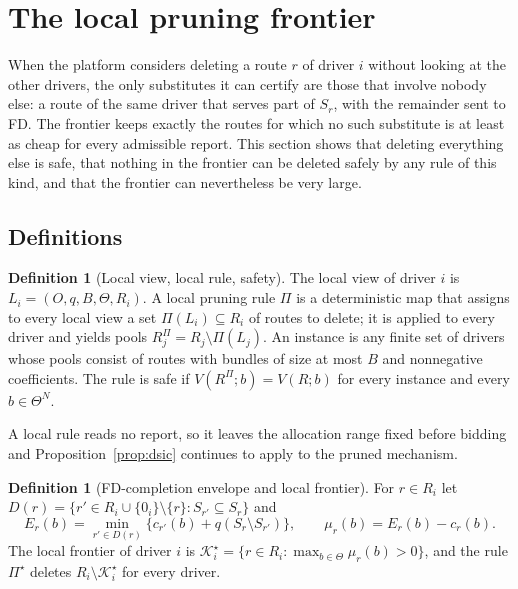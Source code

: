 \documentclass[review,12pt]{elsarticle}
\theoremstyle{definition}
\newtheorem{definition}[theorem]{Definition}
\theoremstyle{remark}
\newcommand{\Kstar}{\mathcal{K}^\star}
\begin{document}
\section{The local pruning frontier}
\label{sec:frontier}

When the platform considers deleting a route $r$ of driver $i$ without
looking at the other drivers, the only substitutes it can certify are
those that involve nobody else: a route of the same driver that serves part
of $S_r$, with the remainder sent to FD. The frontier keeps exactly the
routes for which no such substitute is at least as cheap for every
admissible report. This section shows that deleting everything else is
safe, that nothing in the frontier can be deleted safely by any rule of
this kind, and that the frontier can nevertheless be very large.

\subsection{Definitions}

\begin{definition}[Local view, local rule, safety]
\label{def:local}
The local view of driver $i$ is $L_i=(O,q,B,\Theta,R_i)$. A local pruning
rule $\Pi$ is a deterministic map that assigns to every local view a set
$\Pi(L_i)\subseteq R_i$ of routes to delete; it is applied to every driver
and yields pools $R^\Pi_j=R_j\setminus\Pi(L_j)$. An instance is any finite
set of drivers whose pools consist of routes with bundles of size at most
$B$ and nonnegative coefficients. The rule is safe if $V(R^\Pi;b)=V(R;b)$
for every instance and every $b\in\Theta^N$.
\end{definition}

A local rule reads no report, so it leaves the allocation range fixed
before bidding and Proposition~\ref{prop:dsic} continues to apply to the
pruned mechanism.

\begin{definition}[FD-completion envelope and local frontier]
\label{def:frontier}
For $r\in R_i$ let $D(r)=\{r'\in R_i\cup\{0_i\}\setminus\{r\}:S_{r'}\subseteq S_r\}$
and
\[
E_r(b)=\min_{r'\in D(r)}\bigl\{c_{r'}(b)+q(S_r\setminus S_{r'})\bigr\},\qquad
\mu_r(b)=E_r(b)-c_r(b).
\]
The local frontier of driver $i$ is
$\Kstar_i=\{r\in R_i:\max_{b\in\Theta}\mu_r(b)>0\}$, and the rule $\Pi^\star$
deletes $R_i\setminus\Kstar_i$ for every driver.
\end{definition}
\end{document}
